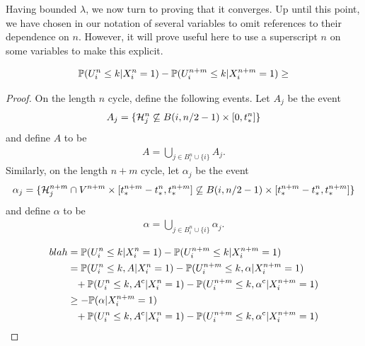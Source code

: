	Having bounded $\lambda$, we now turn to proving that it converges.
	Up until this point, we have chosen in our notation of several variables to omit references to their dependence on $n$. However, it will prove useful here to use a superscript $n$ on some variables to make this explicit. 

	\begin{lemma}
		\begin{equation}
			\mathbb{P}(U_i^n \leq k | X_i^n = 1) - \mathbb{P}(U_i^{n+m} \leq k | X_i^{n+m} = 1) \geq 
		\end{equation}
	\end{lemma}
	\begin{proof}
		On the length $n$ cycle, define the following events. Let $A_j$ be the event
		\begin{align}
			A_j = \{\mathcal{H}_j^n \not \subseteq B(i, n/2 - 1) \times [0, t_*^n]\}
		\end{align}
		and define $A$ to be
		\begin{align}
			A = \bigcup_{j \in B_i^n \cup \{i\}} A_j.
		\end{align}
		Similarly, on the length $n+m$ cycle, let $\alpha_j$ be the event
		\begin{align}
			\alpha_j = \{\mathcal{H}_j^{n+m} \cap V^{n+m} \times [t_*^{n+m} - t_*^n, t_*^{n+m}] \not \subseteq B(i, n/2 - 1) \times [t_*^{n+m} - t_*^n, t_*^{n+m}]\}
		\end{align}
		and define $\alpha$ to be
		\begin{align}
			\alpha = \bigcup_{j \in B_i^n \cup \{i\}} \alpha_j.
		\end{align}

		\begin{align}
			blah &= \mathbb{P}(U_i^n \leq k | X_i^n = 1) - \mathbb{P}(U_i^{n+m} \leq k | X_i^{n+m} = 1) \\
			&= \mathbb{P}(U_i^n \leq k, A | X_i^n = 1) - \mathbb{P}(U_i^{n+m} \leq k, \alpha | X_i^{n+m} = 1) \notag \\
			&\phantom{=} + \mathbb{P}(U_i^n \leq k, A^\mathrm{c} | X_i^n = 1) - \mathbb{P}(U_i^{n+m} \leq k, \alpha^\mathrm{c} | X_i^{n+m} = 1) \\
			&\geq -\mathbb{P}(\alpha | X_i^{n+m} = 1) \notag \\
			&\phantom{=} + \mathbb{P}(U_i^n \leq k, A^\mathrm{c} | X_i^n = 1) - \mathbb{P}(U_i^{n+m} \leq k, \alpha^\mathrm{c} | X_i^{n+m} = 1)
		\end{align}


\end{proof}
